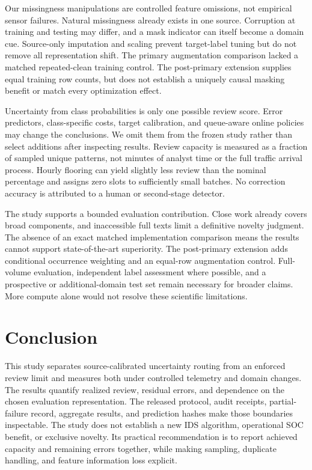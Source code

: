 \documentclass[manuscript,screen,nonacm]{acmart}
\begin{document}
Our missingness manipulations are controlled feature omissions, not empirical sensor failures. Natural missingness already exists in one source. Corruption at training and testing may differ, and a mask indicator can itself become a domain cue. Source-only imputation and scaling prevent target-label tuning but do not remove all representation shift. The primary augmentation comparison lacked a matched repeated-clean training control. The post-primary extension supplies equal training row counts, but does not establish a uniquely causal masking benefit or match every optimization effect.

Uncertainty from class probabilities is only one possible review score. Error predictors, class-specific costs, target calibration, and queue-aware online policies may change the conclusions. We omit them from the frozen study rather than select additions after inspecting results. Review capacity is measured as a fraction of sampled unique patterns, not minutes of analyst time or the full traffic arrival process. Hourly flooring can yield slightly less review than the nominal percentage and assigns zero slots to sufficiently small batches. No correction accuracy is attributed to a human or second-stage detector.

The study supports a bounded evaluation contribution. Close work already covers broad components, and inaccessible full texts limit a definitive novelty judgment. The absence of an exact matched implementation comparison means the results cannot support state-of-the-art superiority. The post-primary extension adds conditional occurrence weighting and an equal-row augmentation control. Full-volume evaluation, independent label assessment where possible, and a prospective or additional-domain test set remain necessary for broader claims. More compute alone would not resolve these scientific limitations.

\section{Conclusion}
This study separates source-calibrated uncertainty routing from an enforced review limit and measures both under controlled telemetry and domain changes. The results quantify realized review, residual errors, and dependence on the chosen evaluation representation. The released protocol, audit receipts, partial-failure record, aggregate results, and prediction hashes make those boundaries inspectable. The study does not establish a new IDS algorithm, operational SOC benefit, or exclusive novelty. Its practical recommendation is to report achieved capacity and remaining errors together, while making sampling, duplicate handling, and feature information loss explicit.
\end{document}
